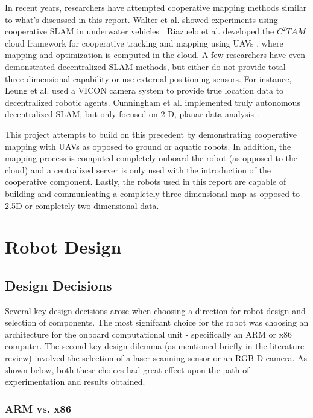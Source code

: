 \documentclass[letterpaper, oneside, 10pt]{report}
\begin{document}
In recent years, researchers have attempted cooperative mapping methods similar to what's discussed in this report. Walter et al. showed experiments using cooperative SLAM in underwater vehicles \cite{walter2004experimental}. Riazuelo et al. developed the $C^{2}TAM$ cloud framework for cooperative tracking and mapping using UAVs \cite{riazuelo2014c}, where mapping and optimization is computed in the cloud. A few researchers have even demonstrated decentralized SLAM methods, but either do not provide total three-dimensional capability or use external positioning sensors. For instance, Leung et al. used a VICON camera system \cite{leung2012decentralized} to provide true location data to decentralized robotic agents. Cunningham et al. implemented truly autonomous decentralized SLAM, but only focused on 2-D, planar data analysis \cite{cunningham2012large}.

This project attempts to build on this precedent by demonstrating cooperative mapping with UAVs as opposed to ground or aquatic robots. In addition, the mapping process is computed completely onboard the robot (as opposed to the cloud) and a centralized server is only used with the introduction of the cooperative component. Lastly, the robots used in this report are capable of building and communicating a completely three dimensional map as opposed to 2.5D or completely two dimensional data.

\chapter{Robot Design}

\section{Design Decisions}

Several key design decisions arose when choosing a direction for robot design and selection of components. The most signifcant choice for the robot was choosing an architecture for the onboard computational unit - specifically an ARM or x86 computer. The second key design dilemma (as mentioned briefly in the literature review) involved the selection of a laser-scanning sensor or an RGB-D camera. As shown below, both these choices had great effect upon the path of experimentation and results obtained.

\subsection{ARM vs. x86}
\end{document}
